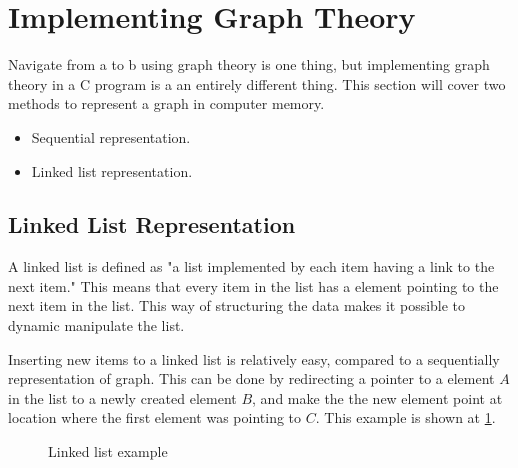 \section{Implementing Graph Theory}

Navigate from a to b using graph theory is one thing, but implementing graph theory in a C program is a an entirely different thing. This section will cover two methods to represent a graph in computer memory. 

\begin{itemize}
	\item Sequential representation.
	\item Linked list representation.
\end{itemize} 


\subsection{Linked List Representation}
A linked list is defined as "a list implemented by each item having a link to the next item."\cite{linked_list_def}
This means that every item in the list has a element pointing to the next item in the list. This way of structuring the data makes it possible to dynamic manipulate the list.\cite{Linked_List}

Inserting new items to a linked list is relatively easy, compared to a sequentially representation of graph. 
This can be done by redirecting a pointer to a element $A$ in the list to a newly created element $B$, and make the the new element point at location where the first element was pointing to $C$. This example is shown at \cref{fig:link}.

\begin{figure}[h]
 \centering
{}
\caption{Linked list example} \label{fig:link}
\end{figure}

